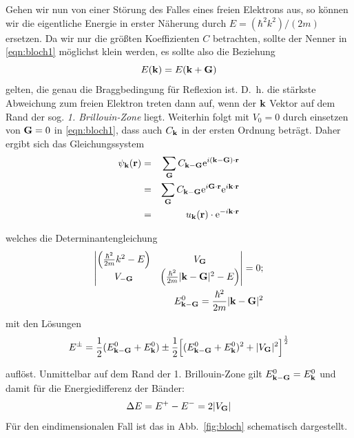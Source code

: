 Gehen wir nun von einer Störung des Falles eines freien Elektrons aus, so können wir 
die eigentliche Energie in erster Näherung durch $E = (\hbar^2 k^2) / (2m)$ ersetzen. 
Da wir nur die größten Koeffizienten $C$ betrachten, sollte der Nenner 
in \eqref{eqn:bloch1} möglichst klein werden, es sollte also die Beziehung 
\begin{equation}
    E(\mathbf{k}) = E(\mathbf{k} + \mathbf{G})
\end{equation}
gelten, die genau die Braggbedingung für Reflexion ist. D.~h. die stärkste Abweichung zum freien 
Elektron treten dann auf, wenn der $\mathbf{k}$ Vektor auf dem Rand der sog. \emph{1. Brillouin-Zone} liegt. 
Weiterhin folgt mit $V_0 = 0$ durch einsetzen von $\mathbf{G} = 0$ in \eqref{eqn:bloch1}, dass auch $C_{\mathbf{k}}$ in der ersten Ordnung 
beträgt. Daher ergibt sich das Gleichungssystem 
\begin{eqnarray}
    \psi_{\mathbf{k}}(\mathbf{r})&=& \sum_{\mathbf{G}} C_{\mathbf{k} - \mathbf{G}} \mathrm{e}^{i(\mathbf{k} - \mathbf{G}) \cdot \mathbf{r}} \nonumber \\
            &=& \sum_{\mathbf{G}} C_{\mathbf{k} - \mathbf{G}} \mathrm{e}^{i \mathbf{G} \cdot \mathbf{r}}  \mathrm{e}^{i\mathbf{k} \cdot \mathbf{r}} \nonumber \\
            &=& u_{\mathbf{k}}(\mathbf{r}) \cdot \mathrm{e}^{-i\mathbf{k} \cdot \mathbf{r}} 
\end{eqnarray}

welches die Determinantengleichung 
\begin{eqnarray}
    \begin{vmatrix}
        \Big(\frac{\hbar^2}{2m} k^2 - E\Big) & V_{\mathbf{G}} \\
        V_\mathbf{-G}   & \Big(\frac{\hbar^2}{2m} |\mathbf{k} - \mathbf{G}|^2 - E\Big) 
    \end{vmatrix} = 0; \\
    E_{\mathbf{k} - \mathbf{G}}^0 = \frac{\hbar^2}{2m} |\mathbf{k} - \mathbf{G}|^2 \nonumber
\end{eqnarray}
mit den Lösungen 
\begin{equation}
    E^\pm = 
    \frac{1}{2}(E_{\mathbf{k} - \mathbf{G}}^0 + E_{\mathbf{k}}^0) \pm 
        \frac{1}{2}\Big[(E_{\mathbf{k} - \mathbf{G}}^0 + E_{\mathbf{k}}^0)^2 + |V_{\mathbf{G}}|^2\Big]^{\frac{1}{2}}
\end{equation}

auflöst. Unmittelbar auf dem Rand der 1. Brillouin-Zone gilt $E_{\mathbf{k} - \mathbf{G}}^0 = E_{\mathbf{k}}^0$ und 
damit für die Energiedifferenz der Bänder: 
\begin{equation}
    \Delta E = E^+ - E^- = 2 |V_{\mathbf{G}}|
\end{equation}
Für den eindimensionalen Fall ist das in Abb.~\ref{fig:bloch} schematisch dargestellt.
\cite{ibach2009festkorperphysik} 

